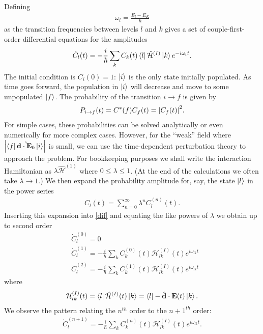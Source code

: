 \documentclass{book}
\theoremstyle{definition}
\newcommand{\ham}{\mathcal{H}}
\newcommand{\f}[2]{\frac{#1}{#2}}
\begin{document}
Defining
\begin{align}
\omega_l = \f{E_l - E_K}{\hbar}
\end{align}
as the transition frequencies between levels $l$ and $k$ gives a set of couple-first-order differential equations for the amplitudes
\begin{align}\label{dif}
\dot{C}_l(t)=  - \f{i}{\hbar}\sum_k C_k(t)\bra{l}\hat{\ham}^{(I)}\ket{k} e^{-i\omega_l t}.
\end{align}
The initial condition is $C_i(0) = 1$: $\ket{i}$ is the only state initially populated. As time goes forward, the population in $\ket{i}$ will decrease and move to some unpopulated $\ket{f}$. The probability of the transition $i \to f$ is given by
\begin{align}
P_{i\to f}(t) = C^*(f)C_f(t) = \abs{C_f(t)}^2. 
\end{align}
For simple cases, these probabilities can be solved analytically or even numerically for more complex cases. However, for the ``weak'' field where $\abs{\bra{f}\hat{\mathbf{d}\cdot\mathbf{E}_0}\ket{i}}$ is small, we can use the time-dependent perturbation theory to approach the problem. For bookkeeping purposes we shall write the interaction Hamiltonian as $\lambda \hat{\ham}^{(1)}$ where $0 \leq \lambda \leq 1$. (At the end of the calculations we often take $\lambda \to 1$.) We then expand the probability amplitude for, say, the state $\ket{l}$ in the power series
\begin{align}
C_l(t) = \sum_{n = 0}^\infty \lambda^n C_l^{(n)}(t).
\end{align} 
Inserting this expansion into \eqref{dif} and equating the like powers of $\lambda$ we obtain up to second order
\begin{align}
&\dot{C}_l^{(0)} = 0\\
&\dot{C}_l^{(1)} = -\f{i}{\hbar}\sum_k C_k^{(0)}(t)\ham^{(I)}_{lk}(t)e^{i\omega_{lk}t}\\
&\dot{C}_l^{(2)} = -\f{i}{\hbar}\sum_k C_k^{(1)}(t)\ham^{(I)}_{lk}(t)e^{i\omega_{lk}t}
\end{align}
where
\begin{align}
\ham^{(I)}_{lk}(t) = \bra{l}\hat{\ham}^{(I)}(t)\ket{k} = \bra{l}- \hat{\mathbf{d}} \cdot\mathbf{E}(t)\ket{k}.
\end{align}
We observe the pattern relating the $n^{th}$ order to the $n+1^{th}$ order:
\begin{align}
\dot{C}_l^{(n+1)} = -\f{i}{\hbar}\sum_k C_k^{(n)}(t)\ham^{(I)}_{lk}(t)e^{i\omega_{lk}t}.
\end{align}
\end{document}
